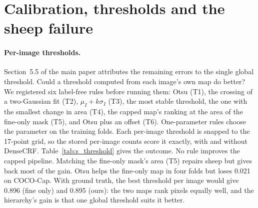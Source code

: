 \documentclass[10pt,twocolumn,letterpaper]{article}
\begin{document}
\section{Calibration, thresholds and the sheep failure}
\label{sec:s_calibration}

\paragraph{Per-image thresholds.}
Section~5.5 of the main paper attributes the remaining errors to the single global threshold. Could a threshold computed from each image's own map do better? We registered six label-free rules before running them: Otsu (T1), the crossing of a two-Gaussian fit (T2), $\mu_I+k\sigma_I$ (T3), the most stable threshold, \ie the one with the smallest change in area (T4), the capped map's ranking at the area of the fine-only mask (T5), and Otsu plus an offset (T6). One-parameter rules choose the parameter on the training folds. Each per-image threshold is snapped to the 17-point grid, so the stored per-image counts score it exactly, with and without DenseCRF. Table~\ref{tab:s_threshold} gives the outcome. No rule improves the capped pipeline. Matching the fine-only mask's area (T5) repairs sheep but gives back most of the gain. Otsu helps the fine-only map in four folds but loses 0.021 on COCO-Cap. With ground truth, the best threshold per image would give 0.896 (fine only) and 0.895 (ours): the two maps rank pixels equally well, and the hierarchy's gain is that one global threshold suits it better.
\end{document}
